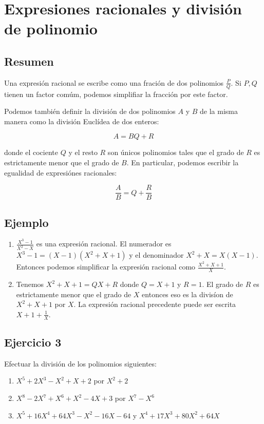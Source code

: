 \section{Expresiones racionales y división de polinomio}

\subsection*{Resumen}

Una expresión racional se escribe como una fración de dos polinomios
$\frac{P}{Q}$. Si $P, Q$ tienen un factor comúm, podemos simplifiar la fracción
por este factor.

Podemos también definir la división de dos polinomios $A$ 
y $B$ de la misma manera como la división Euclídea de dos enteros:

$$A = B Q + R$$

donde el cociente $Q$ y el resto $R$ son únicos polinomios tales que el grado
de $R$ es estrictamente menor que el grado de $B$. En particular, podemos
escribir la egualidad de expresiónes racionales:

$$\frac{A}{B} = Q + \frac{R}{B}$$

\subsection*{Ejemplo}

\begin{enumerate}
\item $\frac{X^3-1}{X^2-X}$ es una expresión racional. El numerador es
  $X^3 - 1 = {(X-1)}{(X^2+X+1)}$ y el denominador $X^2+X = X{(X-1)}$. Entonces
  podemos simplificar la expresión racional como $\frac{X^2+X+1}{X}$.
\item Tenemos $X^2+X+1 = Q X + R$ donde $Q = X + 1$ y $R = 1$. El grado de $R$
  es estrictamente menor que el grado de $X$ entonces eso es la divisíon de
  $X^2+X+1$ por $X$. La expresión racional precedente puede ser escrita
  $X+1 + \frac{1}{X}$.
\end{enumerate}

\subsection*{Ejercicio 3}

Efectuar la división de los polinomios siguientes:

\begin{enumerate}
\item $X^5+2X^3-X^2+X+2$ por $X^2+2$
\item $X^8-2X^7+X^6+X^2-4X+3$ por $X^7 - X^6$
\item $X^5+16X^4+64X^3-X^2-16X-64$ y $X^4+17X^3+80X^2+64X$
\end{enumerate}

